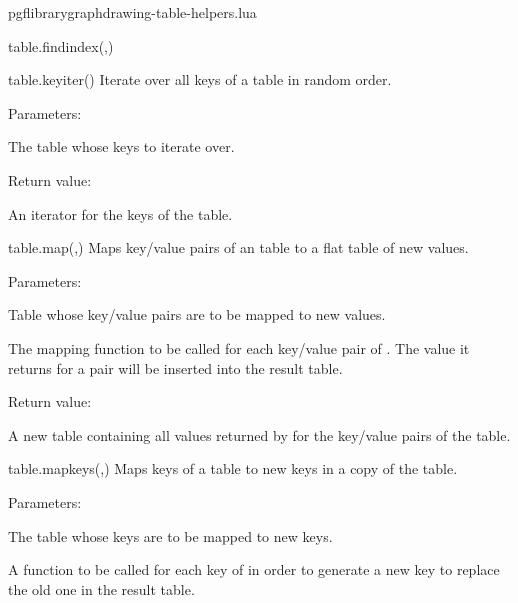 \begin{filedescription}{pgflibrarygraphdrawing-table-helpers.lua}
\begin{luacommand}{{table.find\textunderscore{}index}(,)}
\end{luacommand}
\begin{luacommand}{{table.key\textunderscore{}iter}()}
Iterate over all keys of a table in random order. 

Parameters:
\begin{parameterdescription}
	\item[\meta{table}] The table whose keys to iterate over. 
\end{parameterdescription}


Return value:
\begin{parameterdescription} 
  \item[] An iterator for the keys of the table. 
\end{parameterdescription}


\end{luacommand}
\begin{luacommand}{{table.map}(,)}
Maps key/value pairs of an  table to a flat table of new values. 

Parameters:
\begin{parameterdescription}
	\item[\meta{input}] Table whose key/value pairs are to be mapped to new values.\item[\meta{map\_func}] The mapping function to be called for each key/value pair of . The value it returns for a pair will be inserted into the result table. 
\end{parameterdescription}


Return value:
\begin{parameterdescription} 
  \item[] A new table containing all values returned by  for the key/value pairs of the  table. 
\end{parameterdescription}


\end{luacommand}
\begin{luacommand}{{table.map\textunderscore{}keys}(,)}
Maps keys of a table to new keys in a copy of the table. 

Parameters:
\begin{parameterdescription}
	\item[\meta{table}] The table whose keys are to be mapped to new keys.\item[\meta{map\_func}] A function to be called for each key of  in order to generate a new key to replace the old one in the result table. 
\end{parameterdescription}



\end{luacommand}
\end{filedescription}
